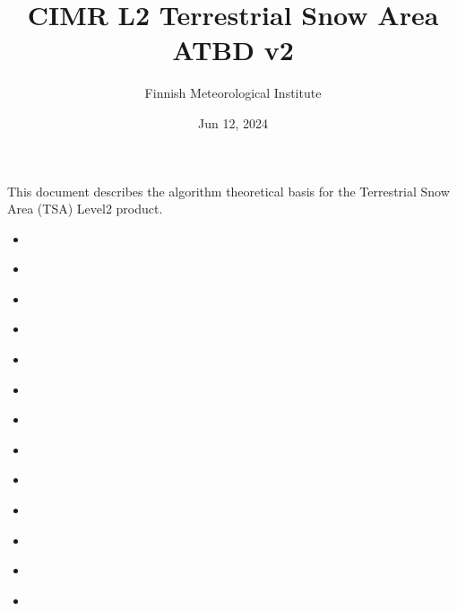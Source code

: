 \documentclass[letterpaper,10pt,english]{jupyterBook}
\title{CIMR L2 Terrestrial Snow Area ATBD v2}
\date{Jun 12, 2024}
\author{Finnish Meteorological Institute}
\begin{document}
\pagestyle{empty}
\sphinxmaketitle
\pagestyle{plain}
\sphinxtableofcontents
\pagestyle{normal}
\label{\detokenize{book/intro::doc}}


\sphinxAtStartPar
This document describes the algorithm theoretical basis for the Terrestrial Snow Area (TSA) Level\sphinxhyphen{}2 product.
\begin{itemize}
\item {} 
\sphinxAtStartPar
{\hyperref[\detokenize{book/abstract::doc}]{}}

\item {} 
\sphinxAtStartPar
{\hyperref[\detokenize{book/applicable_ref_docs::doc}]{}}

\item {} 
\sphinxAtStartPar
{\hyperref[\detokenize{book/acronyms::doc}]{}}

\item {} 
\sphinxAtStartPar
{\hyperref[\detokenize{book/definitions::doc}]{}}

\item {} 
\sphinxAtStartPar
{\hyperref[\detokenize{book/introduction_purpose_scope::doc}]{}}

\item {} 
\sphinxAtStartPar
{\hyperref[\detokenize{book/background_justification_algorithm::doc}]{}}

\item {} 
\sphinxAtStartPar
{\hyperref[\detokenize{book/L2_product_definition::doc}]{}}

\item {} 
\sphinxAtStartPar
{\hyperref[\detokenize{book/baseline_algorithm_definition::doc}]{}}

\item {} 
\sphinxAtStartPar
{\hyperref[\detokenize{book/algorithm_input_output_data_definition::doc}]{}}

\item {} 
\sphinxAtStartPar
{\hyperref[\detokenize{book/algorithm_performance_assessment::doc}]{}}

\item {} 
\sphinxAtStartPar
{\hyperref[\detokenize{book/roadmap::doc}]{}}

\item {} 
\sphinxAtStartPar
{\hyperref[\detokenize{book/references::doc}]{}}

\item {} 
\sphinxAtStartPar
{\hyperref[\detokenize{book/annex::doc}]{}}

\end{itemize}
\end{document}
